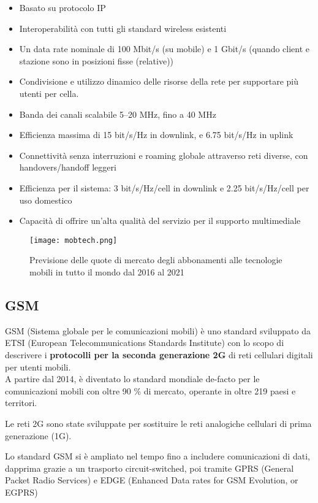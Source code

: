\begin{itemize}
  \item Basato su protocolo IP
  \item Interoperabilità con tutti gli standard wireless esistenti
  \item Un data rate nominale di 100 Mbit/s (su mobile) e 1 Gbit/s (quando
client e stazione sono in posizioni fisse (relative))
  \item Condivisione e utilizzo dinamico delle risorse della rete per
supportare più utenti per cella.
  \item Banda dei canali scalabile 5–20 MHz, fino a 40 MHz
  \item Efficienza massima di 15 bit/s/Hz in downlink, e 6.75
bit/s/Hz in uplink
  \item Connettività senza interruzioni e roaming globale attraverso reti
diverse, con handovers/handoff leggeri
  \item Efficienza per il sistema: 3 bit/s/Hz/cell in downlink
e 2.25 bit/s/Hz/cell per uso domestico
  \item Capacità di offrire un'alta qualità del servizio per il supporto
multimediale
\end{itemize}

\begin{figure}[H]
  \centering
  \texttt{[image: mobtech.png]}
  \caption{Previsione delle quote di mercato degli abbonamenti alle tecnologie
mobili in tutto il mondo dal 2016 al 2021}
  \label{fig:mobtech}
\end{figure}

\subsection{GSM}

GSM (Sistema globale per le comunicazioni mobili) è uno standard
sviluppato da ETSI (European Telecommunications Standards Institute) con lo
scopo di descrivere i \textbf{protocolli per la seconda generazione 2G} di reti
cellulari digitali per utenti mobili. \\

A partire dal 2014, è diventato lo standard mondiale de-facto per le
comunicazioni mobili con oltre 90 \% di mercato, operante in oltre 219 paesi
e territori.

Le reti 2G sono state sviluppate per sostituire le reti analogiche cellulari
di prima generazione (1G).

Lo standard GSM si è ampliato nel tempo fino a includere comunicazioni di
dati, dapprima grazie a un trasporto circuit-switched, poi tramite GPRS
(General Packet Radio Services) e EDGE (Enhanced Data rates for GSM
Evolution, or EGPRS)

